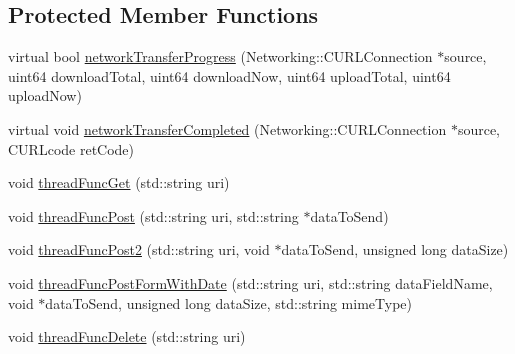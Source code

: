 \subsection*{Protected Member Functions}
\begin{DoxyCompactItemize}
\item 
virtual bool \hyperlink{classfl4cpp_1_1_sync_h_t_t_p_request_a8ffd18b3ee2268efd08f6f3140e45aa8}{network\+Transfer\+Progress} (Networking\+::\+C\+U\+R\+L\+Connection $\ast$source, uint64 download\+Total, uint64 download\+Now, uint64 upload\+Total, uint64 upload\+Now)
\item 
virtual void \hyperlink{classfl4cpp_1_1_sync_h_t_t_p_request_aa9faa0be8c32b0e8e8eccb9523ef22c8}{network\+Transfer\+Completed} (Networking\+::\+C\+U\+R\+L\+Connection $\ast$source, C\+U\+R\+Lcode ret\+Code)
\item 
void \hyperlink{classfl4cpp_1_1_sync_h_t_t_p_request_af16332c5f5eb8b81d56ac96840eafbed}{thread\+Func\+Get} (std\+::string uri)
\item 
void \hyperlink{classfl4cpp_1_1_sync_h_t_t_p_request_a6fe6581fc1e53508425239f8d2d418e7}{thread\+Func\+Post} (std\+::string uri, std\+::string $\ast$data\+To\+Send)
\item 
void \hyperlink{classfl4cpp_1_1_sync_h_t_t_p_request_a25936c3ed111a8b77e1c1d36e7cbc3e2}{thread\+Func\+Post2} (std\+::string uri, void $\ast$data\+To\+Send, unsigned long data\+Size)
\item 
void \hyperlink{classfl4cpp_1_1_sync_h_t_t_p_request_ab36e884543b4711726349bc59b7d610a}{thread\+Func\+Post\+Form\+With\+Date} (std\+::string uri, std\+::string data\+Field\+Name, void $\ast$data\+To\+Send, unsigned long data\+Size, std\+::string mime\+Type)
\item 
void \hyperlink{classfl4cpp_1_1_sync_h_t_t_p_request_aba23afda4062ff75a459f7ce12198ca3}{thread\+Func\+Delete} (std\+::string uri)
\end{DoxyCompactItemize}
